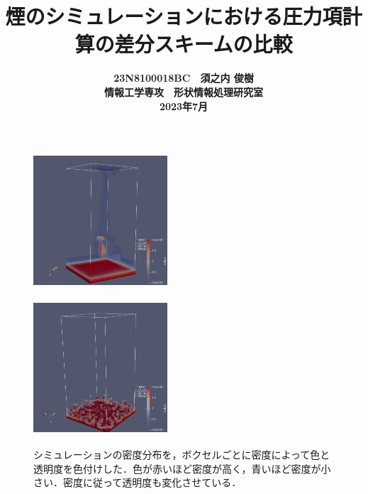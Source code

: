 \documentclass[10pt,a4paper,notitlepage,oneside,twocolumn]{abst_jsarticle}
\title{
{\bf 煙のシミュレーションにおける圧力項計算の差分スキームの比較}
}
\author{\begin{center}
{\large {\bf 23N8100018BC　須之内 俊樹}}\\
{\large {\bf 情報工学専攻　形状情報処理研究室}}\\
{\large {\bf 2023年7月}}
\end{center}}
\date{}
\begin{document}
\maketitle
\begin{figure}[h]
\begin{minipage}[t]{0.5\linewidth}
  \centering
  \includegraphics[height=5cm,width=5cm]{fd_conf_73.png}
  \label{fig:fig1}
  \end{minipage}
  \begin{minipage}[t]{0.5\linewidth}
  \centering
  \includegraphics[height=5cm,width=5cm]{cd_smoke.png}
  \label{fig:fig2}
  \end{minipage}
\caption{シミュレーションの密度分布を，ボクセルごとに密度によって色と透明度を色付けした．色が赤いほど密度が高く，青いほど密度が小さい．密度に従って透明度も変化させている．}
\label{fig}
\end{figure}
\end{document}
